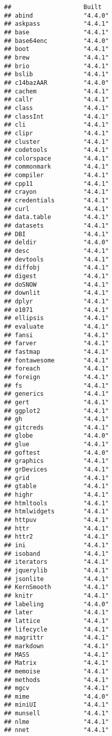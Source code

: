 \documentclass[
]{article}
\begin{document}
\begin{verbatim}
##                    Built  
## abind              "4.4.0"
## askpass            "4.4.1"
## base               "4.4.1"
## base64enc          "4.4.0"
## boot               "4.4.1"
## brew               "4.4.1"
## brio               "4.4.1"
## bslib              "4.4.1"
## c14bazAAR          "4.4.0"
## cachem             "4.4.1"
## callr              "4.4.1"
## class              "4.4.1"
## classInt           "4.4.1"
## cli                "4.4.1"
## clipr              "4.4.1"
## cluster            "4.4.1"
## codetools          "4.4.1"
## colorspace         "4.4.1"
## commonmark         "4.4.1"
## compiler           "4.4.1"
## cpp11              "4.4.1"
## crayon             "4.4.1"
## credentials        "4.4.1"
## curl               "4.4.1"
## data.table         "4.4.1"
## datasets           "4.4.1"
## DBI                "4.4.1"
## deldir             "4.4.0"
## desc               "4.4.1"
## devtools           "4.4.1"
## diffobj            "4.4.1"
## digest             "4.4.1"
## doSNOW             "4.4.1"
## downlit            "4.4.1"
## dplyr              "4.4.1"
## e1071              "4.4.1"
## ellipsis           "4.4.1"
## evaluate           "4.4.1"
## fansi              "4.4.1"
## farver             "4.4.1"
## fastmap            "4.4.1"
## fontawesome        "4.4.1"
## foreach            "4.4.1"
## foreign            "4.4.1"
## fs                 "4.4.1"
## generics           "4.4.1"
## gert               "4.4.1"
## ggplot2            "4.4.1"
## gh                 "4.4.1"
## gitcreds           "4.4.1"
## globe              "4.4.0"
## glue               "4.4.1"
## goftest            "4.4.0"
## graphics           "4.4.1"
## grDevices          "4.4.1"
## grid               "4.4.1"
## gtable             "4.4.1"
## highr              "4.4.1"
## htmltools          "4.4.1"
## htmlwidgets        "4.4.1"
## httpuv             "4.4.1"
## httr               "4.4.1"
## httr2              "4.4.1"
## ini                "4.4.1"
## isoband            "4.4.1"
## iterators          "4.4.1"
## jquerylib          "4.4.1"
## jsonlite           "4.4.1"
## KernSmooth         "4.4.1"
## knitr              "4.4.1"
## labeling           "4.4.0"
## later              "4.4.1"
## lattice            "4.4.1"
## lifecycle          "4.4.1"
## magrittr           "4.4.1"
## markdown           "4.4.1"
## MASS               "4.4.1"
## Matrix             "4.4.1"
## memoise            "4.4.1"
## methods            "4.4.1"
## mgcv               "4.4.1"
## mime               "4.4.0"
## miniUI             "4.4.1"
## munsell            "4.4.1"
## nlme               "4.4.1"
## nnet               "4.4.1"

\end{verbatim}
\end{document}
